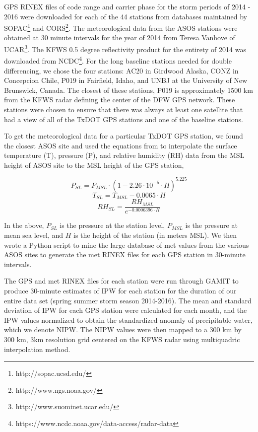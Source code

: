 \documentclass[proposal]{umassthesis}
\begin{document}
GPS RINEX files of code range and carrier phase for the storm periods of 2014 - 2016 were downloaded for each of the 44 stations from databases maintained by SOPAC\footnote{http://sopac.ucsd.edu/} \cite{bock1997scripps} and CORS\footnote{http://www.ngs.noaa.gov/}\cite{snay2008continuously}. The meteorological data from the ASOS stations were obtained at 30 minute intervals for the year of 2014 from Teresa Vanhove of UCAR\footnote{http://www.suominet.ucar.edu/}. The KFWS 0.5 degree reflectivity product for the entirety of 2014 was downloaded from NCDC\footnote{https://www.ncdc.noaa.gov/data-access/radar-data}. For the long baseline stations needed for double differencing, we chose the four stations: AC20 in Girdwood Alaska, CONZ in Concepcion Chile, P019 in Fairfield, Idaho, and UNBJ at the University of New Brunswick, Canada. The closest of these stations, P019 is approximately 1500 km from the KFWS radar defining the center of the DFW GPS network. These stations were chosen to ensure that there was always at least one satellite that had a view of all of the TxDOT GPS stations and one of the baseline stations.

To get the meteorological data for a particular TxDOT GPS station, we found the closest ASOS site and used the equations from \cite{bai2003gps} to interpolate the surface temperature (T), pressure (P), and relative humidity (RH) data from the MSL height of ASOS site to the MSL height of the GPS station,
 
\begin{equation}
P_{SL} = P_{MSL} \cdot (1 - 2.26 \cdot 10^{-5} \cdot H)^{5.225}
\end{equation}
\begin{equation}
T_{SL} = T_{MSL} - 0.0065 \cdot H
\end{equation}
\begin{equation}
RH_{SL} = \dfrac{RH_{MSL}}{e^{-0.0006396 \cdot H}}
\end{equation}

In the above, $P_{SL}$ is the pressure at the station level, $P_{MSL}$ is the pressure at mean sea level, and $H$ is the height of the station (in meters MSL). We then wrote a Python script to mine the large database of met values from the various ASOS sites to generate the met RINEX files for each GPS station in 30-minute intervals. 

The GPS and met RINEX files for each station were run through GAMIT to produce 30-minute estimates of IPW for each station for the duration of our entire data set (spring summer storm season 2014-2016). The mean and standard deviation of IPW for each GPS station were calculated for each month, and the IPW values normalized to obtain the standardized anomaly of precipitable water, which we denote NIPW. The NIPW values were then mapped to a 300 km by 300 km, 3km resolution grid centered on the KFWS radar using multiquadric interpolation method.
\end{document}

